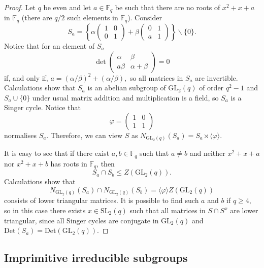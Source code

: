 \documentclass[a4paper,reqno,11pt]{amsart}
\theoremstyle{definition}
\theoremstyle{remark}
\numberwithin{equation}{section}
\newcommand{\Det}{\mathrm{Det}}
\newcommand{\SL}{{\mathrm{SL}}}
\newcommand{\GL}{{\mathrm{GL}}}
\begin{document}
\begin{proof}
Let $q$ be even and let $a \in \mathbb{F}_q $ be such that there are no roots of $x^2+x+a$ in $\mathbb{F}_q$ (there are $q/2$ such elements in $\mathbb{F}_q$). 
 Consider  
\begin{equation} \label{thesineven}
S_a= \left\{
\alpha \begin{pmatrix}
1    & 0  \\
      0    &   1       
\end{pmatrix} + 
\beta \begin{pmatrix}
0    & 1  \\
a    &  1       
\end{pmatrix}
\right\} \backslash \{0\}.
\end{equation} Notice that  for an element of $S_a$
$$\det \begin{pmatrix}
\alpha    & \beta  \\
    a  \beta    & \alpha +\beta      
\end{pmatrix} =0$$ if, and only if, $a=(\alpha/ \beta)^2 +(\alpha/\beta),$ so all matrices in $S_a$ are invertible. 
 Calculations show that $S_a$ is an abelian subgroup of $\GL_2(q)$ of order $q^2-1$ and $S_a \cup \{0\}$ under usual matrix addition and multiplication is a field, so $S_a$ is a Singer cycle. Notice that 
$$\varphi = \begin{pmatrix}
1    & 0  \\
1    &  1       
\end{pmatrix}$$
normalises $S_a.$  Therefore, we can view $S$ as   $N_{\GL_2(q)}(S_a)=S_a \rtimes \langle \varphi \rangle$.

 It is easy to see that if there exist $a, b \in \mathbb{F}_q$ such that $a \ne b$
and neither $x^2+x+a$ nor $x^2+x+b$ has roots in $\mathbb{F}_q$, then $$S_a \cap S_b \le Z(\GL_2(q)).$$
Calculations show that  
\begin{equation}
\label{2sindiageven}
N_{\GL_2(q)}(S_a) \cap N_{\GL_2(q)}(S_b)=\langle \varphi \rangle Z(\GL_2(q))
\end{equation} consists of  lower triangular matrices. It is possible to find such $a$ and $b$ if $q \ge 4,$ so in this case there exists $x \in \SL_2(q)$ such that all matrices in $S \cap S^x$ are  lower triangular,   since all Singer cycles are conjugate in $\GL_2(q)$ and $\Det(S_a)=\Det(\GL_2(q)).$
\end{proof}


\subsection{Imprimitive irreducible subgroups}\label{impsec}
\end{document}
